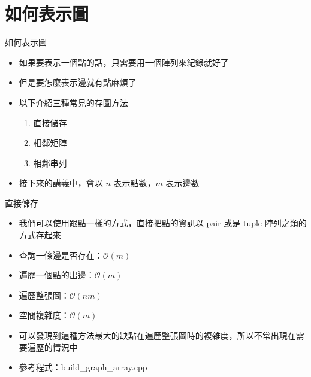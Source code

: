 \documentclass[aspectratio=169]{beamer}
\begin{document}
    \section{如何表示圖}

    \begin{frame}{如何表示圖}
        \begin{itemize}
            \item<1-> 如果要表示一個點的話，只需要用一個陣列來紀錄就好了
            \item<2-> 但是要怎麼表示邊就有點麻煩了
            \item<3-> 以下介紹三種常見的存圖方法
            \begin{enumerate}
                \item<4-> 直接儲存
                \item<4-> 相鄰矩陣
                \item<4-> 相鄰串列
            \end{enumerate}
            \item<4-> 接下來的講義中，會以 $n$ 表示點數，$m$ 表示邊數
        \end{itemize}
    \end{frame}

    \begin{frame}{直接儲存}
        \begin{itemize}
            \item<1-> 我們可以使用跟點一樣的方式，直接把點的資訊以 pair 或是 tuple 陣列之類的方式存起來
            \item<2-> 查詢一條邊是否存在：$\mathcal{O}(m)$
            \item<2-> 遍歷一個點的出邊：$\mathcal{O}(m)$
            \item<2-> 遍歷整張圖：$\mathcal{O}(nm)$
            \item<2-> 空間複雜度：$\mathcal{O}(m)$
            \item<3-> 可以發現到這種方法最大的缺點在遍歷整張圖時的複雜度，所以不常出現在需要遍歷的情況中
            \item<3-> 參考程式：build\_graph\_array.cpp
        \end{itemize}
    \end{frame}
\end{document}
